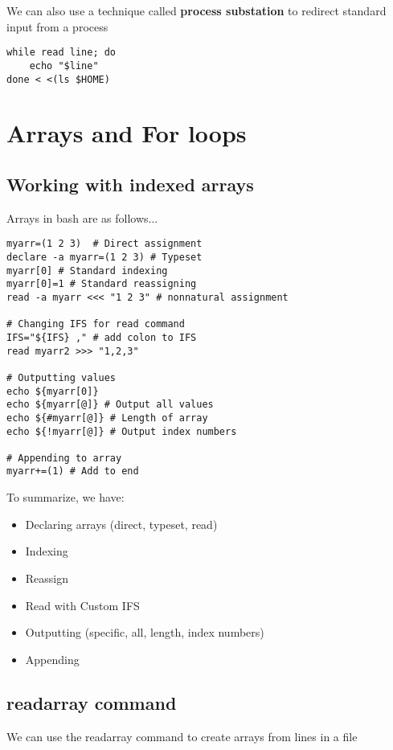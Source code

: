 \documentclass{report}
\begin{document}
    \bigbreak \noindent 
    We can also use a technique called \textbf{process substation} to redirect standard input from a process
    
    \begin{verbatim}
while read line; do
    echo "$line"
done < <(ls $HOME)
    \end{verbatim}
    \bigbreak \noindent
    

    \pagebreak \bigbreak \noindent 
    \section{\LARGE Arrays and For loops}
    \bigbreak \noindent 
    \subsection{Working with indexed arrays}
    Arrays in bash are as follows...
    
    \begin{verbatim}
myarr=(1 2 3)  # Direct assignment
declare -a myarr=(1 2 3) # Typeset
myarr[0] # Standard indexing
myarr[0]=1 # Standard reassigning
read -a myarr <<< "1 2 3" # nonnatural assignment

# Changing IFS for read command
IFS="${IFS} ," # add colon to IFS
read myarr2 >>> "1,2,3"

# Outputting values
echo ${myarr[0]}
echo ${myarr[@]} # Output all values
echo ${#myarr[@]} # Length of array
echo ${!myarr[@]} # Output index numbers

# Appending to array
myarr+=(1) # Add to end
    \end{verbatim}
    \bigbreak \noindent
    
    \bigbreak \noindent 
    To summarize, we have:
    \begin{itemize}
        \item Declaring arrays (direct, typeset, read)
        \item Indexing
        \item Reassign
        \item  Read with Custom IFS
        \item Outputting (specific, all, length, index numbers)
        \item Appending
    \end{itemize}

    \pagebreak \bigbreak \noindent 
    \subsection{readarray command}
    \bigbreak \noindent 
    We can use the readarray command to create arrays from lines in a file
    
\end{document}
